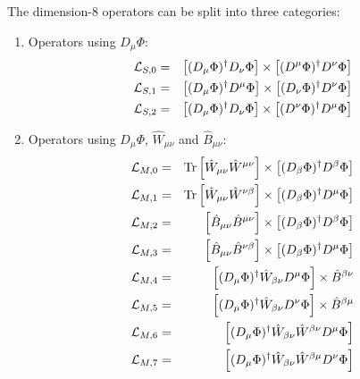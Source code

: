 \documentclass[english,12pt]{article}
\begin{document}
\vskip6pt
\noindent
The dimension-8 operators can be split into three categories:
\begin{enumerate}
 \item Operators using $D_\mu \Phi$:
  \begin{eqnarray}
   {\cal L}_{S,0} &=& \left[ (D_\mu \Phi)^\dagger D_\nu \Phi \right] \times
      \left[ ( D^\mu \Phi)^\dagger D^\nu \Phi \right] \nonumber\\
   {\cal L}_{S,1} &=& \left[ ( D_\mu \Phi )^\dagger D^\mu \Phi  \right] \times
      \left[ ( D_\nu \Phi )^\dagger D^\nu \Phi \right] \nonumber\\
   {\cal L}_{S,2} &=& \left[ (D_\mu \Phi)^\dagger D_\nu \Phi \right] \times
      \left[ ( D^\nu \Phi)^\dagger D^\mu \Phi \right]
  \end{eqnarray}

 \item Operators using $D_\mu \Phi$, $\hat{W}_{\mu \nu}$ and $\hat{B}_{\mu \nu}$:
  \begin{eqnarray}
   {\cal L}_{M,0} &=& \hbox{Tr}\left[ \hat{W}_{\mu\nu} \hat{W}^{\mu\nu} \right] \times 
      \left[ ( D_\beta \Phi )^\dagger D^\beta \Phi \right] \nonumber\\
   {\cal L}_{M,1} &=& \hbox{Tr}\left[ \hat{W}_{\mu\nu} \hat{W}^{\nu\beta} \right] \times  
      \left[ ( D_\beta \Phi )^\dagger D^\mu \Phi \right] \nonumber\\
   {\cal L}_{M,2} &=& \left[ \hat{B}_{\mu\nu} \hat{B}^{\mu\nu} \right ] \times  
      \left [ ( D_\beta \Phi )^\dagger D^\beta \Phi \right ] \nonumber\\
   {\cal L}_{M,3} &=& \left[ \hat{B}_{\mu\nu} \hat{B}^{\nu\beta} \right ] \times  
      \left [ ( D_\beta \Phi )^\dagger D^\mu \Phi \right ] \nonumber\\
   {\cal L}_{M,4} &=& \left[ ( D_\mu \Phi )^\dagger \hat{W}_{\beta\nu} 
      D^\mu \Phi  \right] \times \hat{B}^{\beta\nu} \nonumber\\
   {\cal L}_{M,5} &=& \left[ ( D_\mu \Phi )^\dagger \hat{W}_{\beta\nu} 
      D^\nu \Phi  \right] \times \hat{B}^{\beta\mu} \nonumber\\
   {\cal L}_{M,6} &=& \left[ ( D_\mu \Phi )^\dagger \hat{W}_{\beta\nu} 
      \hat{W}^{\beta\nu} D^\mu \Phi \right] \nonumber\\
   {\cal L}_{M,7} &=& \left[ ( D_\mu \Phi )^\dagger \hat{W}_{\beta\nu} 
      \hat{W}^{\beta\mu} D^\nu \Phi  \right]
  \end{eqnarray}


\end{enumerate}
\end{document}
